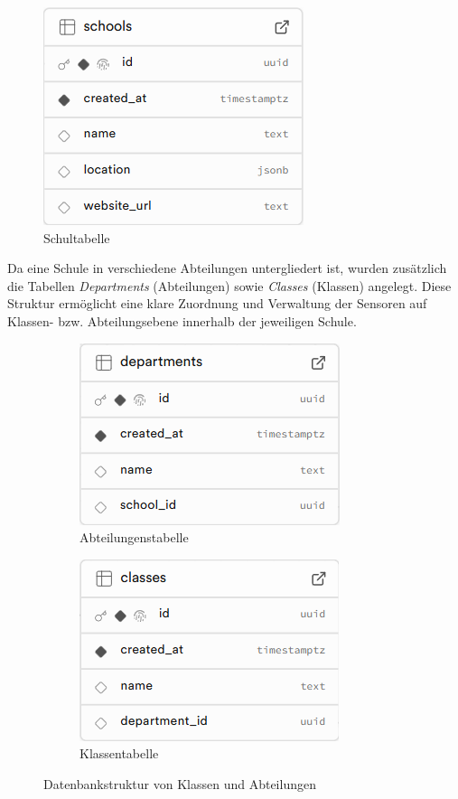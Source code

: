 \begin{inhalt}
\begin{figure}[!htb]
  \centering
  \includegraphics[scale=0.5]{files/Thomas/pics/Datenbank_Design/school.png}
  \caption[Schultabelle der Datenbank]{Schultabelle}
  \label{fig:schools_tabelle}
\end{figure}

\newpage

Da eine Schule in verschiedene Abteilungen untergliedert ist, wurden zusätzlich die Tabellen \textit{Departments} (Abteilungen) sowie \textit{Classes} (Klassen) angelegt. Diese Struktur ermöglicht eine klare Zuordnung und Verwaltung der Sensoren auf Klassen- bzw. Abteilungsebene innerhalb der jeweiligen Schule.

\begin{figure}[!htb]
  \centering
  \begin{subfigure}[b]{0.45\textwidth}
    \centering
    \includegraphics[scale=0.45]{files/Thomas/pics/Datenbank_Design/departments.png}
    \caption[Tabelle Departments]{Abteilungenstabelle}
    \label{fig:departments_tabelle}
  \end{subfigure}
  \hfill
  \begin{subfigure}[b]{0.45\textwidth}
    \centering
    \includegraphics[scale=0.45]{files/Thomas/pics/Datenbank_Design/classes.png}
    \caption[Tabelle Classes]{Klassentabelle}
    \label{fig:classes_tabelle}
  \end{subfigure}
  \caption[Abteilungs- und Klassentabellen]{Datenbankstruktur von Klassen und Abteilungen}
  \label{fig:departments_classes}
\end{figure}


\end{inhalt}
